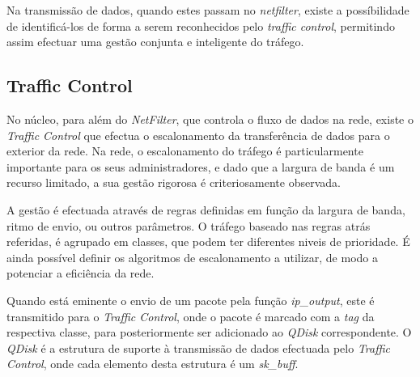 Na transmissão de dados, quando estes passam no \textit{netfilter}, existe a possíbilidade de identificá-los de forma a serem reconhecidos pelo \textit{traffic control}, permitindo assim efectuar uma gestão conjunta e inteligente do tráfego.

\subsection{Traffic Control}
\label{sub:traffic_control}


No núcleo, para além do \textit{NetFilter}, que controla o fluxo de dados na rede, existe o \textit{Traffic Control} que efectua o escalonamento da transferência de dados para o exterior da rede.
Na rede, o escalonamento do tráfego é particularmente importante para os seus administradores, e dado que a largura de banda é um recurso limitado, a sua gestão rigorosa é criteriosamente observada.

A gestão é efectuada através de regras definidas em função da largura de banda, ritmo de envio, ou outros parâmetros.
O tráfego baseado nas regras atrás referidas, é agrupado em classes, que podem ter diferentes niveis de prioridade.
É ainda possível definir os algoritmos de escalonamento a utilizar, de modo a potenciar a eficiência da rede.

Quando está eminente o envio de um pacote pela função \textit{ip\_output}, este é transmitido para o \textit{Traffic Control}, onde o pacote é marcado com a \textit{tag} da respectiva classe, para posteriormente ser adicionado ao \textit{QDisk} correspondente.
O \textit{QDisk} é a estrutura de suporte à transmissão de dados efectuada pelo \textit{Traffic Control}, onde cada elemento desta estrutura é um \textit{sk\_buff}.


